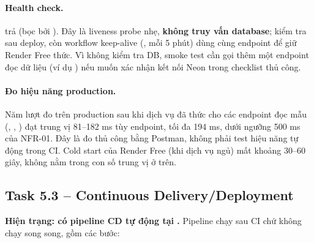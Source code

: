 \paragraph{Health check.}
 trả
 (bọc bởi ). Đây là liveness
probe nhẹ, \textbf{không truy vấn database};  kiểm tra  sau
deploy, còn workflow keep-alive (, mỗi 5 phút) dùng cùng
endpoint để giữ Render Free thức. Vì không kiểm tra DB, smoke test cần gọi thêm một endpoint đọc
dữ liệu (ví dụ ) nếu muốn xác nhận kết nối Neon trong checklist thủ công.

\paragraph{Đo hiệu năng production.}
Năm lượt đo trên production sau khi dịch vụ đã thức cho các endpoint đọc mẫu (,
, ) đạt trung vị 81--182 ms tùy endpoint, tối đa 194 ms,
dưới ngưỡng 500 ms của NFR-01. Đây là đo thủ công bằng Postman, không phải test hiệu năng tự động
trong CI. Cold start của Render Free (khi dịch vụ ngủ) mất khoảng 30--60 giây, không nằm trong con
số trung vị ở trên.

\subsection{Task 5.3 -- Continuous Delivery/Deployment}

\textbf{Hiện trạng: có pipeline CD tự động tại .} Pipeline chạy sau
CI chứ không chạy song song, gồm các bước:

